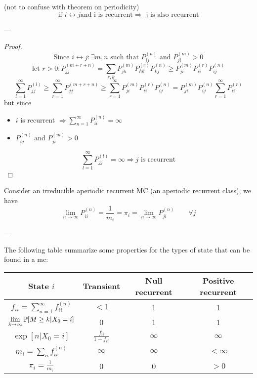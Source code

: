 	\begin{theorem}
		(not to confuse with theorem on periodicity)
		$$\text{if } i\leftrightarrow j \text{and i is recurrent} \Rightarrow \text{ j is also recurrent}$$
	\end{theorem}
	---
	\begin{proof}
		$$\text{Since } i\leftrightarrow j : \exists m,n \text{ such that } P_{ij}^{(n)} \text{ and } P_{ji}^{(m)} > 0$$
		$$\text{let } r>0 : P_{jj}^{(m+r+n)} = \sum\limits_{r, k} P_{jh}^{(m)} P_{hk}^{(r)} P_{kj}^{(n)} \geq P_{ji}^{(m)}  P_{ii}^{(r)}  P_{ij}^{(n)}$$
		$$\sum\limits_{l=1}^\infty P_{jj}^{(l)} \geq \sum\limits_{r=1}^\infty P_{jj}^{(m+r+n)} \geq \sum\limits_{r=1}^\infty P_{ji}^{(m)}  P_{ii}^{(r)}  P_{ij}^{(n)} = P_{ji}^{(m)} P_{ij}^{(n)} \sum\limits_{r=1}^\infty P_{ii}^{(r)}$$
		but since \begin{itemize}
		\item$i$ is recurrent $\Rightarrow \sum\limits_{n=1}^\infty P_{ii}^{(n)} = \infty$
		\item $P_{ij}^{(n)} \text{ and } P_{ji}^{(m)} > 0$
		\end{itemize}
		$$\sum\limits_{l=1}^\infty P_{jj}^{(l)} = \infty \Rightarrow j \text{ is recurrent}$$
	\end{proof}

	\begin{theorem} \label{th:basic_limit_MC}
		Consider an irreducible aperiodic recurrent MC (an aperiodic recurrent class), we have
		$$ \lim_{n\to \infty} P_{ii}^{(n)} = \frac{1}{m_i} = \pi_i = \lim_{n\to\infty} P_{ji}^{(n)} \qquad \forall j$$
	\end{theorem}

	---

	The following table summarize some properties for the types of state that can be found in a \gls{mc}:

	{\renewcommand{\arraystretch}{1.2}
	\begin{center}
		\begin{tabular}{|c||c|c|c|}
			\hline
			State $i$ & Transient & Null recurrent & Positive recurrent \\ \hline
			$f_{ii} = \sum\limits_{n=1}^\infty f_{ii}^{(n)}$ & $<1$ & 1 & 1 \\ \hline
			$\lim\limits_{k \to \infty } \mathbb{P}[M \geq k | X_0=i]$ & 0 & 1 & 1 \\ \hline
			$\exp[n|X_0=i]$ & $\frac{f_{ii}}{1-f_{ii}}$ & $\infty$ & $\infty$ \\ \hline
			$m_i = \sum\limits_n f_{ii}^{(n)}$ & $\infty$ & $\infty$ & $<\infty$ \\ \hline
			$\pi_i = \frac{1}{m_i}$ & 0 & 0 & $>0$ \\ \hline %
		\end{tabular}
	\end{center}}

